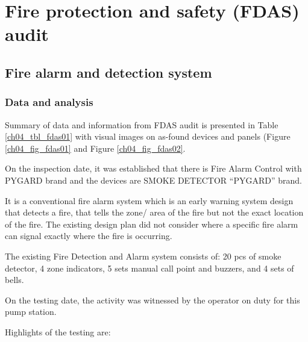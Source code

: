 \section{Fire protection and safety (FDAS) audit} \label{ch04fdas}


\subsection{Fire alarm and detection system} \label{ch04fdas01}
\subsubsection{Data and analysis}
Summary of data and information from FDAS audit is presented in Table \ref{ch04_tbl_fdas01} with visual images on as-found devices and panels (Figure \ref{ch04_fig_fdas01} and Figure \ref{ch04_fig_fdas02}.%







On the inspection date, it was established that there is Fire Alarm Control with PYGARD brand and the devices are SMOKE DETECTOR “PYGARD” brand. 

It is a conventional fire alarm system which is an early warning system design that detects a fire, that tells the zone/ area of the fire but not the exact location of the fire. The existing design plan did not consider where a specific fire alarm can signal exactly where the fire is occurring.

The existing Fire Detection and Alarm system consists of: 20 pcs of smoke detector, 4 zone indicators, 5 sets manual call point and buzzers, and 4 sets of bells. 

On the testing date, the activity was witnessed by the operator on duty for this pump station.


%

%

Highlights of the testing are:

